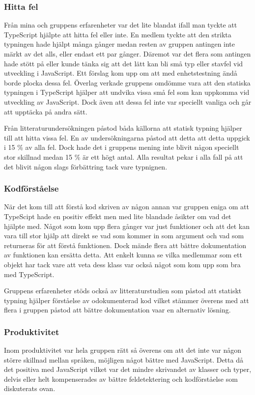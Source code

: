 \subsubsection{Hitta fel}
Från mina och gruppens erfarenheter var det lite blandat ifall man tyckte att TypeScript hjälpte att hitta fel eller inte. En medlem tyckte att den strikta typningen hade hjälpt många gånger medan resten av gruppen antingen inte märkt av det alls, eller endast ett par gånger. Däremot var det flera som antingen hade stött på eller kunde tänka sig att det lätt kan bli små typ eller stavfel vid utveckling i JavaScript. Ett förslag kom upp om att med enhetstestning ändå borde plocka dessa fel. Överlag verkade gruppens omdömme vara att den statiska typningen i TypeScript hjälper att undvika vissa små fel som kan uppkomma vid utveckling av JavaScript. Dock även att dessa fel inte var speciellt vanliga och går att upptäcka på andra sätt.

Från litteraturundersökningen påstod båda källorna att statisk typning hjälper till att hitta vissa fel. En av undersökningarna påstod att detta att detta uppgick i 15 \% av alla fel. \cite{henrik_totypeornot} Dock hade det i gruppens mening inte blivit någon speciellt stor skillnad medan 15 \% är ett högt antal. Alla resultat pekar i alla fall på att det blivit någon slags förbättring tack vare typnignen.
\subsubsection{Kodförståelse}
När det kom till att förstå kod skriven av någon annan var gruppen eniga om att TypeScipt hade en positiv effekt men med lite blandade åsikter om vad det hjälpte med. Något som kom upp flera gånger var just funktioner och att det kan vara till stor hjälp att direkt se vad som kommer in som argument och vad som returneras för att förstå funktionen. Dock mände flera att bättre dokumentation av funktionen kan ersätta detta. Att enkelt kunna se vilka medlemmar som ett objekt har tack vare att veta dess klass var också något som kom upp som bra med TypeScript.

Gruppens erfarenheter stöds också av litteraturstudien som påstod att statiskt typning hjälper förståelse av odokumenterad kod \cite{henrik_maintainability} vilket stämmer överens med att flera i gruppen påstod att bättre dokumentation vaar en alternativ lösning.
\subsubsection{Produktivitet}
Inom produktivitet var hela gruppen rätt så överens om att det inte var någon större skillnad mellan språken, möjligen något bättre med JavaScript. Detta då det positiva med JavaScript vilket var det mindre skrivandet av klasser och typer, delvis eller helt kompenserades av bättre feldetektering och kodförståelse som diskuterats ovan.

